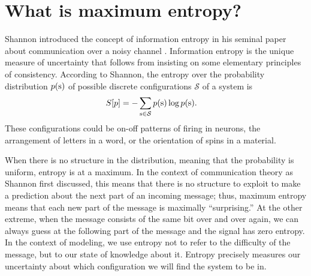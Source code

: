 \documentclass[aps,prl,twocolumn,nofootinbib]{revtex4-1}
\begin{document}

\section{What is maximum entropy?}
Shannon introduced the concept of information entropy in his seminal paper about communication over a noisy channel \cite{Shannon:1948wk}. Information entropy is the unique measure of uncertainty that follows from insisting on some elementary principles of consistency. According to Shannon, the entropy over the probability distribution $p({\rm s})$ of possible discrete configurations $\mathcal S$ of a system is
\begin{align}
	S[p] &= -\sum_{{\rm s}\in \mathcal{S}} p({\rm s}) \log p({\rm s}).
\end{align}
These configurations could be on-off patterns of firing in neurons, the arrangement of letters in a word, or the orientation of spins in a material.

When there is no structure in the distribution, meaning that the probability is uniform, entropy is at a maximum. In the context of communication theory as Shannon first discussed, this means that there is no structure to exploit to make a prediction about the next part of an incoming message; thus, maximum entropy means that each new part of the message is maximally ``surprising.'' At the other extreme, when the message consists of the same bit over and over again, we can always guess at the following part of the message and the signal has zero entropy. In the context of modeling, we use entropy not to refer to the difficulty of the message, but to our state of knowledge about it. Entropy precisely measures our uncertainty about which configuration we will find the system to be in.
\end{document}

